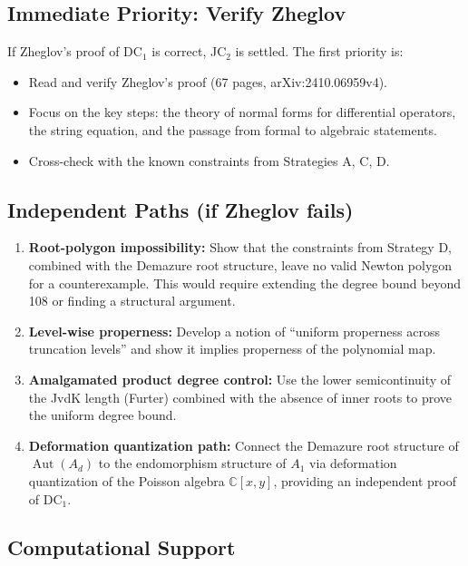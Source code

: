 \documentclass[12pt,a4paper]{article}
\theoremstyle{definition}
\newcommand{\CC}{\mathbb{C}}
\newcommand{\Aut}{\operatorname{Aut}}
\begin{document}
\subsection{Immediate Priority: Verify Zheglov}

If Zheglov's proof of DC$_1$ is correct, JC$_2$ is settled. The first priority is:
\begin{itemize}
\item Read and verify Zheglov's proof (67 pages, arXiv:2410.06959v4).
\item Focus on the key steps: the theory of normal forms for differential operators,
  the string equation, and the passage from formal to algebraic statements.
\item Cross-check with the known constraints from Strategies A, C, D.
\end{itemize}

\subsection{Independent Paths (if Zheglov fails)}

\begin{enumerate}
\item \textbf{Root-polygon impossibility:} Show that the constraints from Strategy D,
  combined with the Demazure root structure, leave no valid Newton polygon for a
  counterexample. This would require extending the degree bound beyond 108 or finding
  a structural argument.

\item \textbf{Level-wise properness:} Develop a notion of ``uniform properness across
  truncation levels'' and show it implies properness of the polynomial map.

\item \textbf{Amalgamated product degree control:} Use the lower semicontinuity of
  the JvdK length (Furter) combined with the absence of inner roots to prove the
  uniform degree bound.

\item \textbf{Deformation quantization path:} Connect the Demazure root structure
  of $\Aut(A_d)$ to the endomorphism structure of $A_1$ via deformation quantization
  of the Poisson algebra $\CC[x,y]$, providing an independent proof of DC$_1$.
\end{enumerate}

\subsection{Computational Support}
\end{document}
